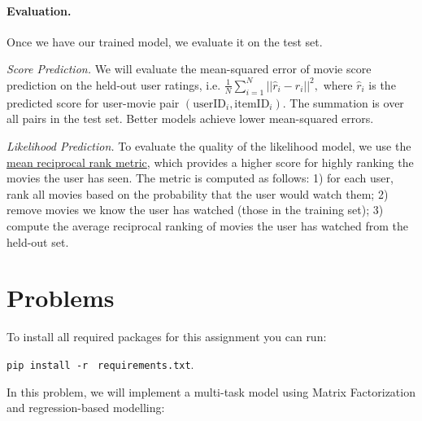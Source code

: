 \documentclass[12pt]{article}
\begin{document}
\paragraph{Evaluation.}
Once we have our trained model, we evaluate it on the test set.

\vspace{0.2cm}
\noindent \emph{Score Prediction.} We will evaluate the mean-squared error of movie score prediction on the held-out user ratings, i.e.
    $
        \frac{1}{N}\sum_{i=1}^N ||\hat{r}_i-r_i||^2,
    $
    where $\hat{r}_i$ is the predicted score for user-movie pair $(\text{userID}_i,\text{itemID}_i)$. The summation is over all pairs in the test set. Better models achieve lower mean-squared errors.
    
    \vspace{0.2cm}
    \noindent \emph{Likelihood Prediction.}  
    To evaluate the quality of the likelihood model, we use the \href{https://en.wikipedia.org/wiki/Mean_reciprocal_rank} {mean reciprocal rank metric}, which provides a higher score for highly ranking the movies the user has seen. The metric is computed as follows: 1) for each user, rank all movies based on the probability that the user would watch them; 2) remove movies we know the user has watched (those in the training set); 3) compute the average reciprocal ranking of movies the user has watched from the held-out set. 
    


\section{Problems}

To install all required packages for this assignment you can run:

\texttt{pip install -r} \texttt{ requirements.txt}.



\noindent In this problem, we will implement a multi-task model using Matrix Factorization \cite{Yehuda2009matrix} and regression-based modelling:

\vspace{0.2cm}
\end{document}
